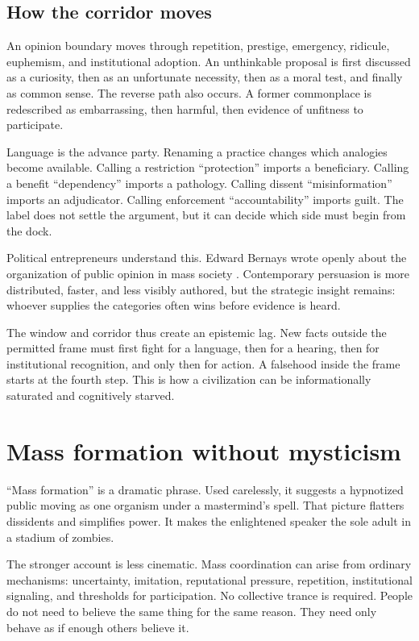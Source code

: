 ﻿\documentclass[12pt,a4paper]{book}
\begin{document}
\subsection{How the corridor moves}

An opinion boundary moves through repetition, prestige, emergency, ridicule, euphemism, and institutional adoption. An unthinkable proposal is first discussed as a curiosity, then as an unfortunate necessity, then as a moral test, and finally as common sense. The reverse path also occurs. A former commonplace is redescribed as embarrassing, then harmful, then evidence of unfitness to participate.

Language is the advance party. Renaming a practice changes which analogies become available. Calling a restriction “protection” imports a beneficiary. Calling a benefit “dependency” imports a pathology. Calling dissent “misinformation” imports an adjudicator. Calling enforcement “accountability” imports guilt. The label does not settle the argument, but it can decide which side must begin from the dock.

Political entrepreneurs understand this. Edward Bernays wrote openly about the organization of public opinion in mass society \cite{bernais-propaganda}. Contemporary persuasion is more distributed, faster, and less visibly authored, but the strategic insight remains: whoever supplies the categories often wins before evidence is heard.

The window and corridor thus create an epistemic lag. New facts outside the permitted frame must first fight for a language, then for a hearing, then for institutional recognition, and only then for action. A falsehood inside the frame starts at the fourth step. This is how a civilization can be informationally saturated and cognitively starved.

\section{Mass formation without mysticism}

“Mass formation” is a dramatic phrase. Used carelessly, it suggests a hypnotized public moving as one organism under a mastermind's spell. That picture flatters dissidents and simplifies power. It makes the enlightened speaker the sole adult in a stadium of zombies.

The stronger account is less cinematic. Mass coordination can arise from ordinary mechanisms: uncertainty, imitation, reputational pressure, repetition, institutional signaling, and thresholds for participation. No collective trance is required. People do not need to believe the same thing for the same reason. They need only behave as if enough others believe it.
\end{document}
